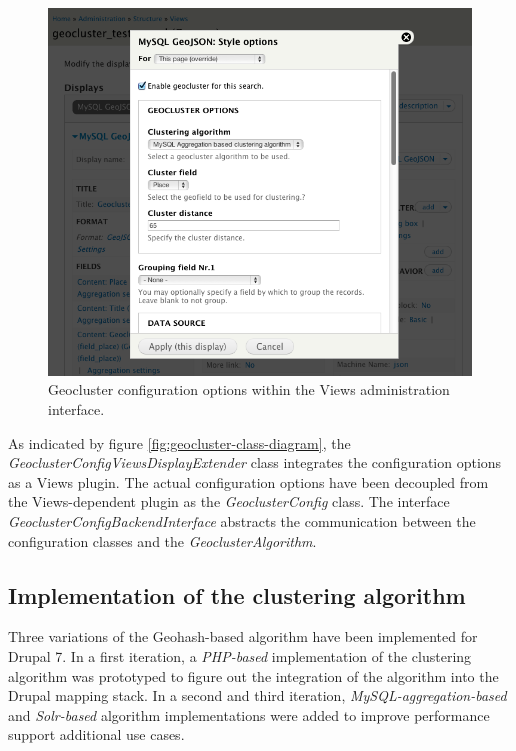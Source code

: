 \begin{figure}[h]
  \begin{center}
    \includegraphics[width=1\textwidth]{figures/geocluster_configuration.png}
    \caption{Geocluster configuration options within the Views administration interface.}
    \label{fig:geocluster-configuration}
  \end{center}
\end{figure}

As indicated by figure \ref{fig:geocluster-class-diagram}, the \textit{GeoclusterConfigViewsDisplayExtender} class integrates the configuration options as a Views plugin. The actual configuration options have been decoupled from the Views-dependent plugin as the \textit{GeoclusterConfig} class. The interface \textit{GeoclusterConfigBackendInterface} abstracts the communication between the configuration classes and the \textit{GeoclusterAlgorithm}. 

\subsection{Implementation of the clustering algorithm}


Three variations of the Geohash-based algorithm have been implemented for Drupal 7. In a first iteration, a \textit{PHP-based} implementation of the clustering algorithm was prototyped to figure out the integration of the algorithm into the Drupal mapping stack. In a second and third iteration, \textit{MySQL-aggregation-based} and \textit{Solr-based} algorithm implementations were added to improve performance support additional use cases. 

